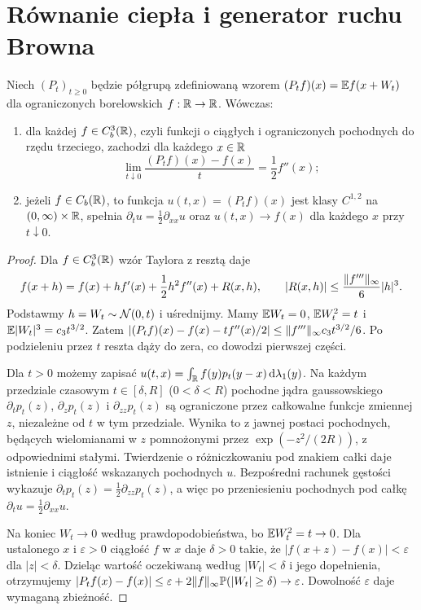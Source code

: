\section{Równanie ciepła i generator ruchu Browna}
\begin{twierdzenie}
Niech $(P_t)_{t\ge0}$ będzie półgrupą zdefiniowaną wzorem
$(P_tf)(x)=\mathbb{E} f(x+W_t)$ dla ograniczonych borelowskich
$f:\mathbb{R}\to\mathbb{R}$. Wówczas:
\begin{enumerate}
\item dla każdej $f\in C_b^3(\mathbb{R})$, czyli funkcji o
ciągłych i ograniczonych pochodnych do rzędu trzeciego,
zachodzi dla każdego $x\in\mathbb{R}$
\[
\lim_{t\downarrow0}\frac{(P_tf)(x)-f(x)}{t}
=\frac12 f''(x);
\]
\item jeżeli $f\in C_b(\mathbb{R})$, to funkcja
$u(t,x)=(P_tf)(x)$ jest klasy $C^{1,2}$ na
$(0,\infty)\times\mathbb{R}$, spełnia
$\partial_tu=\frac12\partial_{xx}u$
oraz $u(t,x)\to f(x)$ dla każdego $x$ przy $t\downarrow0$.
\end{enumerate}
\end{twierdzenie}
\begin{proof}
Dla $f\in C_b^3(\mathbb{R})$ wzór Taylora z resztą daje
\[
f(x+h)=f(x)+hf'(x)+\frac12h^2f''(x)+R(x,h),\qquad
|R(x,h)|\le\frac{\lVert f'''\rVert_\infty}{6}|h|^3.
\]
Podstawmy $h=W_t\sim\mathcal{N}(0,t)$ i uśrednijmy.
Mamy $\mathbb{E} W_t=0$, $\mathbb{E} W_t^2=t$ i
$\mathbb{E}|W_t|^3=c_3t^{3/2}$. Zatem
$|(P_tf)(x)-f(x)-tf''(x)/2|
\le \lVert f'''\rVert_\infty c_3t^{3/2}/6$.
Po podzieleniu przez $t$ reszta dąży do zera,
co dowodzi pierwszej części.

Dla $t>0$ możemy zapisać
$u(t,x)=\int_{\mathbb{R}} f(y)p_t(y-x)\,\mathrm{d}\lambda_1(y)$.
Na każdym przedziale czasowym $t\in[\delta,R]$
($0<\delta<R$) pochodne jądra gaussowskiego
$\partial_t p_t(z)$, $\partial_zp_t(z)$ i
$\partial_{zz}p_t(z)$ są ograniczone przez całkowalne
funkcje zmiennej $z$, niezależne od $t$ w tym przedziale.
Wynika to z jawnej postaci pochodnych, będących
wielomianami w $z$ pomnożonymi przez
$\exp(-z^2/(2R))$, z odpowiednimi stałymi.
Twierdzenie o różniczkowaniu pod znakiem całki daje
istnienie i ciągłość wskazanych pochodnych $u$.
Bezpośredni rachunek gęstości wykazuje
$\partial_t p_t(z)=\frac12\partial_{zz}p_t(z)$,
a więc po przeniesieniu pochodnych pod całkę
$\partial_tu=\frac12\partial_{xx}u$.

Na koniec $W_t\to0$ według prawdopodobieństwa,
bo $\mathbb{E} W_t^2=t\to0$. Dla ustalonego $x$ i
$\varepsilon>0$ ciągłość $f$ w $x$ daje $\delta>0$
takie, że $|f(x+z)-f(x)|<\varepsilon$ dla $|z|<\delta$.
Dzieląc wartość oczekiwaną według $|W_t|<\delta$
i jego dopełnienia, otrzymujemy
$|P_tf(x)-f(x)|\le\varepsilon
+2\lVert f\rVert_\infty\mathbb{P}(|W_t|\ge\delta)\to\varepsilon$.
Dowolność $\varepsilon$ daje wymaganą zbieżność.
\end{proof}

